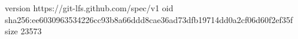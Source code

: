 version https://git-lfs.github.com/spec/v1
oid sha256:ee6030963534226cc93b8a66ddd8cae36ad73dfb19714dd0a2cf06d60f2ef35f
size 23573
